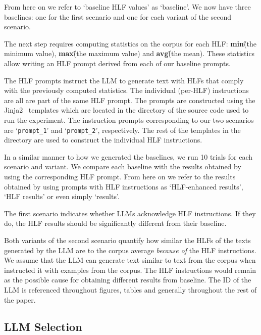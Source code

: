 \documentclass[11pt]{article}
\begin{document}
From here on we refer to `baseline HLF values' as `baseline'.
We now have three baselines: one for the first scenario and one for each variant
of the second scenario.

The next step requires computing statistics on the corpus for each HLF:\@
\textbf{min}\~(the minimum value), \textbf{max}\~(the maximum value) and
\textbf{avg}\~(the mean).
These statistics allow writing an HLF prompt derived from each of our baseline
prompts.

The HLF prompts instruct the LLM to generate text with HLFs that comply with the
previously computed statistics.
The individual (per-HLF) instructions are all are part of the same HLF prompt.
The prompts are constructed using the Jinja2~\cite{jinja2} templates which are
located in the \texttt{}
directory of the source code used to run the experiment.
The instruction prompts corresponding to our two scenarios are
`\texttt{prompt\_1}' and `\texttt{prompt\_2}', respectively.
The rest of the templates in the directory are used to construct the individual
HLF instructions.

In a similar manner to how we generated the baselines, we run 10 trials for each
scenario and variant.
We compare each baseline with the results obtained by using the corresponding
HLF prompt.
From here on we refer to the results obtained by using prompts with HLF
instructions as `HLF-enhanced results', `HLF results' or even simply `results'.

The first scenario indicates whether LLMs acknowledge HLF instructions.
If they do, the HLF results should be significantly different from their
baseline.

Both variants of the second scenario quantify how similar the HLFs of the texts
generated by the LLM are to the corpus average \textit{because of} the HLF
instructions.
We assume that the LLM can generate text similar to text from the corpus when
instructed it with examples from the corpus.
The HLF instructions would remain as the possible cause for obtaining different
results from baseline.
The ID of the LLM is referenced throughout figures, tables and generally
throughout the rest of the paper.

\subsection{LLM Selection}\label{llm-selection}
\end{document}
